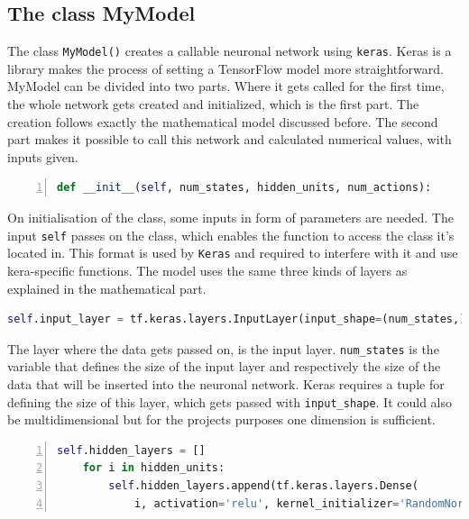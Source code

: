 \documentclass[12pt]{article}
\begin{document}
\subsection{The class MyModel}\label{mymodel}
The class \lstinline{MyModel()} creates a callable \gls{neuronal network} using \lstinline{keras}. Keras is a library makes the process of setting a TensorFlow model more straightforward. MyModel can be divided into two parts. Where it gets called for the first time, the whole network gets created and initialized, which is the first part. The creation follows exactly the mathematical model discussed before. The second part makes it possible to call this network and calculated numerical values, with  \glspl{input} given.
\lstset{ numbers=left, stepnumber=1,      firstnumber=1,  numberfirstline=true}
\begin{lstlisting}[language=Python,numbers=left, caption=Example - Creation of a \gls{neuronal network} using Keras.]
def __init__(self, num_states, hidden_units, num_actions):
\end{lstlisting}
On initialisation of the class, some \glspl{input} in form of parameters are needed. The \gls{input} \lstinline{self} passes on the class, which enables the function to access the class it's located in. This format is used by \lstinline{Keras} and required to interfere with it and use kera-specific functions. The model uses the same three kinds of  \glspl{layer} as explained in the mathematical part.
\lstset{ numbers=left, stepnumber=1,      firstnumber=2,  numberfirstline=true}
\begin{lstlisting}[language=Python]
    self.input_layer = tf.keras.layers.InputLayer(input_shape=(num_states,))
\end{lstlisting}
The layer where the data gets passed on, is the \gls{input layer}. \lstinline{num_states} is the variable that defines the size of the \gls{input layer} and respectively the size of the data that will be inserted into the \gls{neuronal network}. Keras requires a tuple for defining the size of this layer, which gets passed with \lstinline{input_shape}. It could also be multidimensional but for the projects purposes one dimension is sufficient.
\lstset{ numbers=left, stepnumber=1,      firstnumber=4,  numberfirstline=true}
\begin{lstlisting}[language=Python,numbers=left]
    self.hidden_layers = []
    for i in hidden_units: 
        self.hidden_layers.append(tf.keras.layers.Dense( 
            i, activation='relu', kernel_initializer='RandomNormal')) 
\end{lstlisting}
\end{document}
